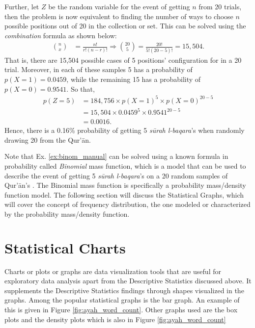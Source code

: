 \begin{exmp}
Further, let $Z$ be the random variable for the event of getting $n$  from 20 trials, then the problem is now equivalent to finding the number of ways to choose $n$ possible positions out of 20 in the collection or set. This can be solved using the \textit{combination} formula as shown below:
\begin{align}
    n \choose x &= \frac{n!}{r!(n-r)!}\Rightarrow{20 \choose 5} = \frac{20!}{5!(20-5)!}=15,504. 
\end{align}
That is, there are 15,504 possible cases of 5 positions' configuration for  in a 20 trial. Moreover, in each of these samples 5 has a probability of $ p(X=1)=0.0459$, while the remaining 15 has a probability of $ p(X=0)=0.9541$. So that,
\begin{align}
     p(Z=5)&=184,756\times p(X=1)^{5}\times p(X=0)^{20-5}\nonumber\\
    &=15,504\times0.0459^{5}\times0.9541^{20-5}\nonumber\\
    &=0.0016.
\end{align}
Hence, there is a 0.16\% probability of getting 5 \textit{s\=urah l-baqara}'s   when randomly drawing 20  from the Qur'\=an.

\end{exmp}
Note that Ex. \ref{ex:binom_manual} can be solved using a known formula in probability called \textit{Binomial} mass function, which is a model that can be used to describe the event of getting 5 \textit{s\=urah l-baqara}'s   on a 20 random samples of Qur'\=an's . The {Binomial} mass function is specifically a probability mass/density function model. The following section will discuss the Statistical Graphs, which will cover the concept of frequency distribution, the one modeled or characterized by the probability mass/density function.
\section{Statistical Charts}\label{sec:stat_graphs_method}
Charts or plots or graphs are data visualization tools that are useful for exploratory data analysis apart from the Descriptive Statistics discussed above. It supplements the Descriptive Statistics findings through shapes visualized in the graphs. Among the popular statistical graphs is the bar graph. An example of this is given in Figure \ref{fig:ayah_word_count}. Other graphs used are the box plots and the density plots which is also in Figure \ref{fig:ayah_word_count}

